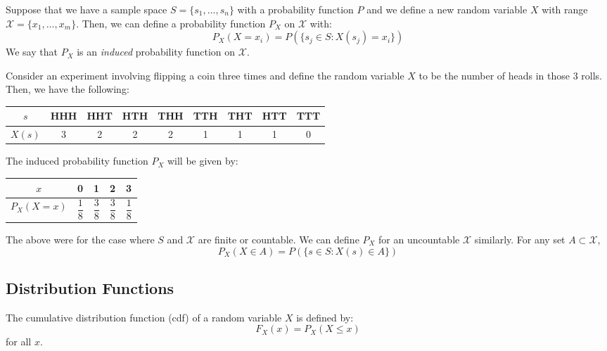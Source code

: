 Suppose that we have a sample space $S = \{s_1, \dots, s_n\}$ with a probability function $P$ and we define a new random variable $X$ with range $\mathcal{X} = \{x_1, \dots, x_m\}$. Then, we can define a probability function $P_X$ on $\mathcal{X}$ with:
\[
P_X(X = x_i) =P(\{s_j \in S: X(s_j) = x_i\})
\]
We say that $P_X$ is an \textit{induced} probability function on $\mathcal{X}$.

\begin{example}
    Consider an experiment involving flipping a coin three times and define the random variable $X$ to be the number of heads in those 3 rolls. Then, we have the following:
    \begin{center}
    \begin{tabular}{c | c c c c c c c c}
    $s$ & HHH & HHT & HTH & THH & TTH & THT & HTT & TTT \\
    \midrule
    $X(s)$ & 3 & 2 & 2 & 2 & 1 & 1 & 1 & 0 \\
    \end{tabular}
    \end{center}
    The induced probability function $P_X$ will be given by:
    \begin{center}
    \begin{tabular}{c | c c c c}
    $x$ & 0 & 1 & 2 & 3 \\
    \midrule
    $P_X(X = x)$ & $\dfrac{1}{8}$ & $\dfrac{3}{8}$ & $\dfrac{3}{8}$ & $\dfrac{1}{8}$ \\
    \end{tabular}
    \end{center}
    \label{ex:probab_func}
\end{example}

The above were for the case where $S$ and $\mathcal{X}$ are finite or countable. We can define $P_X$ for an uncountable $\mathcal{X}$ similarly. For any set $A\subset \mathcal{X}$,
\[
P_X(X \in A) = P(\{s\in S: X(s) \in A\})
\]


\subsection*{Distribution Functions}
\begin{definition}
    The cumulative distribution function (cdf) of a random variable $X$ is defined by:
    \[
    F_X(x) = P_X(X \leq x)
    \]
    for all $x$.
\end{definition}
\nextp

